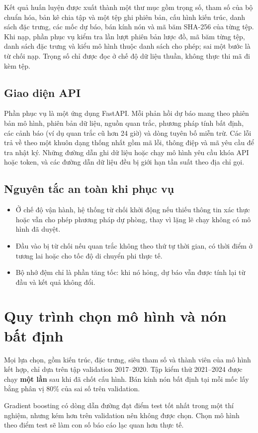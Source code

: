 Kết quả huấn luyện được xuất thành một thư mục gồm trọng số, tham số của bộ
chuẩn hóa, bản kê chia tập và một tệp  ghi phiên bản, cấu hình
kiến trúc, danh sách đặc trưng, các mốc dự báo, bán kính nón và mã băm SHA-256
của từng tệp. Khi nạp, phần phục vụ kiểm tra lần lượt phiên bản lược đồ, mã
băm từng tệp, danh sách đặc trưng và kiểu mô hình thuộc danh sách cho phép;
sai một bước là từ chối nạp. Trọng số chỉ được đọc ở chế độ dữ liệu thuần,
không thực thi mã đi kèm tệp.

\subsection{Giao diện API}

Phần phục vụ là một ứng dụng FastAPI. Mỗi phản hồi dự báo mang theo phiên bản
mô hình, phiên bản dữ liệu, nguồn quan trắc, phương pháp tính bất định, các
cảnh báo (ví dụ quan trắc cũ hơn 24 giờ) và dòng tuyên bố miễn trừ. Các lỗi
trả về theo một khuôn dạng thống nhất gồm mã lỗi, thông điệp và mã yêu cầu để
tra nhật ký. Những đường dẫn ghi dữ liệu hoặc chạy mô hình yêu cầu khóa API
hoặc token, và các đường dẫn dữ liệu đều bị giới hạn tần suất theo địa chỉ
gọi.

\subsection{Nguyên tắc an toàn khi phục vụ}

\begin{itemize}[leftmargin=1.6em, itemsep=2pt]
  \item Ở chế độ vận hành, hệ thống từ chối khởi động nếu thiếu thông tin xác
        thực hoặc vẫn cho phép phương pháp dự phòng, thay vì lặng lẽ chạy
        không có mô hình đã duyệt.
  \item Đầu vào bị từ chối nếu quan trắc không theo thứ tự thời gian, có
        thời điểm ở tương lai hoặc cho tốc độ di chuyển phi thực tế.
  \item Bộ nhớ đệm chỉ là phần tăng tốc: khi nó hỏng, dự báo vẫn được tính
        lại từ đầu và kết quả không đổi.
\end{itemize}

\section{Quy trình chọn mô hình và nón bất định}

Mọi lựa chọn, gồm kiến trúc, đặc trưng, siêu tham số và thành viên của mô
hình kết hợp, chỉ dựa trên tập validation 2017--2020. Tập kiểm thử 2021--2024
được chạy \textbf{một lần} sau khi đã chốt cấu hình. Bán kính nón bất định
tại mỗi mốc lấy bằng phân vị 80\% của sai số trên validation.

\begin{luuy}
Gradient boosting có dòng dẫn đường đạt điểm test tốt nhất trong một thí
nghiệm, nhưng kém hơn trên validation nên không được chọn. Chọn mô hình theo
điểm test sẽ làm con số báo cáo lạc quan hơn thực tế.
\end{luuy}
